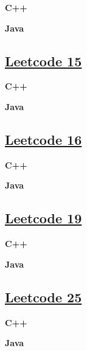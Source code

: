 \textbf{C++}\par


\textbf{Java}\par



\subsection{\href{https://leetcode-cn.com/}{Leetcode 15}}\label{app:codelist:leetcode:15}

\textbf{C++}\par


\textbf{Java}\par



\subsection{\href{https://leetcode-cn.com/}{Leetcode 16}}\label{app:codelist:leetcode:16}

\textbf{C++}\par


\textbf{Java}\par



\subsection{\href{https://leetcode-cn.com/}{Leetcode 19}}\label{app:codelist:leetcode:19}

\textbf{C++}\par


\textbf{Java}\par



\subsection{\href{https://leetcode-cn.com/}{Leetcode 25}}\label{app:codelist:leetcode:25}

\textbf{C++}\par


\textbf{Java}\par



